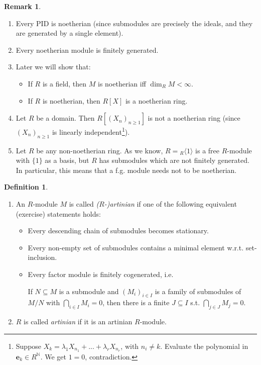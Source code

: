 \documentclass[12pt,a4paper]{report}
\theoremstyle{definition}
\newtheorem{defn}[theorem]{Definition}
\newtheorem*{remark}{Remark}
\theoremstyle{num.custom-title}
\DeclareMathOperator{\N}{\mathbb{N}}
\DeclareMathOperator{\sse}{\subseteq}
\begin{document}
\begin{remark}\ 
\begin{enumerate}
\item Every PID is noetherian (since submodules are precisely the ideals, and they are generated by a single element).
\item Every noetherian module is finitely generated.
\item Later we will show that:
\begin{itemize}
\item If $R$ is a field, then $M$ is noetherian iff $\dim_R M < \infty$.
\item If $R$ is noetherian, then $R[X]$ is a noetherian ring.
\end{itemize}
\item Let $R$ be a domain. Then $R[(X_n)_{n \geq 1}]$ is not a noetherian ring (since $(X_n)_{n \geq 1}$ is linearly independent\footnote{Suppose $X_k = \lambda_1 X_{n_1} + ... + \lambda_r X_{n_r}$, with $n_i \neq k$. Evaluate the polynomial in $\mathbf{e}_k \in R^{\N}$. We get $1=0$, contradiction.}).
\item Let $R$ be any non-noetherian ring. As we know, $R = {}_R \langle 1 \rangle$ is a free $R$-module with $\{1\}$ as a basis, but $R$ has submodules which are not finitely generated. In particular, this means that a f.g. module needs not to be noetherian.
\end{enumerate}
\end{remark}

\begin{defn}\ 
\begin{enumerate}
\item An $R$-module $M$ is called \emph{($R$-)artinian} if one of the following equivalent (exercise) statements holds:
\begin{itemize}
\item Every descending chain of submodules becomes stationary.
\item Every non-empty set of submodules contains a minimal element w.r.t. set-inclusion.
\item Every factor module is finitely cogenerated, i.e.
\begin{center}
If $N \sse M$ is a submodule and $(M_i)_{i \in I}$ is a family of submodules of $M/N$ with $\bigcap_{i \in I} M_i = 0$, then there is a finite $J \sse I$ s.t. $\bigcap_{j \in J} M_j = 0$.
\end{center}
\end{itemize}
\item $R$ is called \emph{artinian} if it is an artinian $R$-module.
\end{enumerate}
\end{defn}
\end{document}
